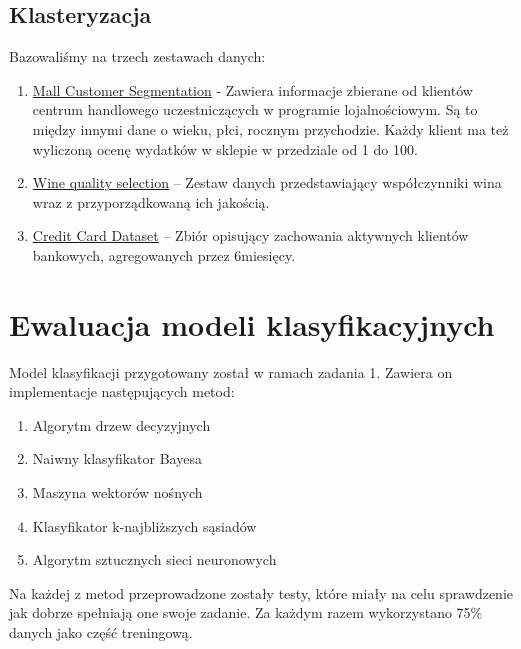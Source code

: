 \documentclass[a4paper,11pt]{article}
\begin{document}
\subsection{Klasteryzacja}

Bazowaliśmy na trzech zestawach danych: 

\begin{enumerate}[label=\Alph*.] \label{zbiory_klasteryzacja}
    \item{\href{https://www.kaggle.com/vjchoudhary7/customer-segmentation-tutorial-in-python}{Mall Customer Segmentation}} - Zawiera informacje zbierane od klientów centrum handlowego uczestniczących w programie lojalnościowym. Są to między innymi dane o wieku, płci, rocznym przychodzie. Każdy klient ma też wyliczoną ocenę wydatków w sklepie w przedziale od 1 do 100.
    \item{\href{https://www.kaggle.com/maitree/wine-quality-selection#winequality-red.csv}{Wine quality selection}} -- Zestaw danych przedstawiający współczynniki wina wraz z przyporządkowaną ich jakością.
    \item{\href{https://www.kaggle.com/arjunbhasin2013/ccdata}{Credit Card Dataset}} -- Zbiór opisujący zachowania aktywnych klientów bankowych, agregowanych przez 6miesięcy.
\end{enumerate}


\section{Ewaluacja modeli klasyfikacyjnych}
Model klasyfikacji przygotowany został w ramach zadania 1. Zawiera on implementacje następujących metod:

\begin{enumerate}
    \item Algorytm drzew decyzyjnych
    \item Naiwny klasyfikator Bayesa
    \item Maszyna wektorów nośnych
    \item Klasyfikator k-najbliższych sąsiadów
    \item Algorytm sztucznych sieci neuronowych
\end{enumerate}

Na każdej z metod przeprowadzone zostały testy, które miały na celu sprawdzenie jak dobrze spełniają one swoje zadanie. Za każdym razem wykorzystano 75\% danych jako część treningową.
\end{document}
